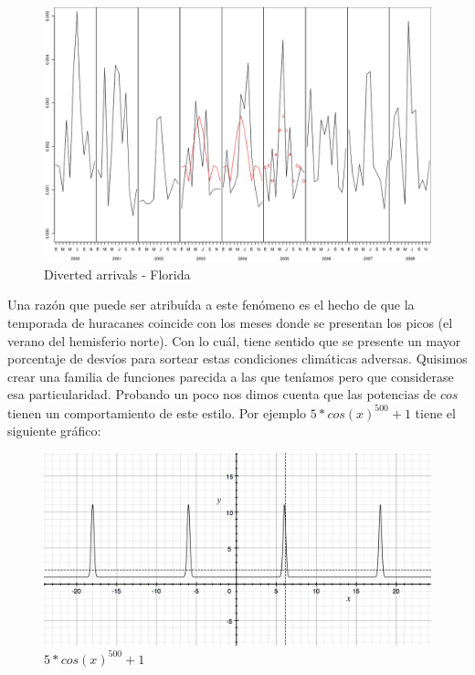 \documentclass{endm}
\begin{document}
\begin{figure}[h!]
  \begin{center}
	\includegraphics[scale=0.4]{img/plot_FL_2003-2005.png}
	\caption{Diverted arrivals - Florida}
	\label{divertedArrivalsFlorida}
  \end{center}
\end{figure}

Una raz\'on que puede ser atribu\'ida a este fen\'omeno es el hecho de que la temporada de huracanes coincide con los meses donde se presentan los picos (el verano del hemisferio norte). Con lo cu\'al, tiene sentido que se presente un mayor porcentaje de desv\'ios para sortear estas condiciones clim\'aticas adversas. Quisimos crear una familia de funciones parecida a las que ten\'iamos pero que considerase esa particularidad.
Probando un poco nos dimos cuenta que las potencias de $cos$ tienen un comportamiento de este estilo. Por ejemplo $5*cos(x)^{500} + 1$ tiene el siguiente gr\'afico:

\begin{figure}[h!]
  \begin{center}
	\includegraphics[scale=0.4]{img/cos500.png}
	\caption{$5*cos(x)^{500} + 1$}
  \end{center}
\end{figure}
\end{document}
